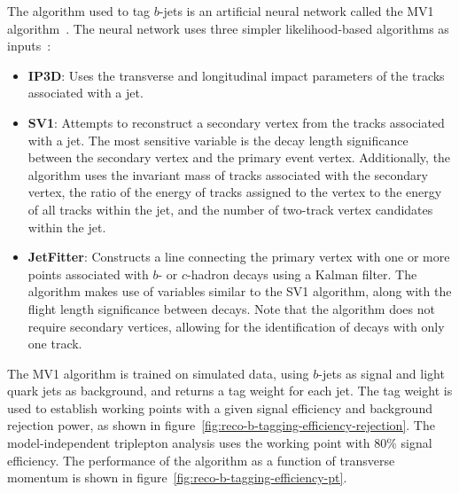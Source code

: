 The algorithm used to tag $b$-jets is an artificial neural network called the MV1 algorithm~\cite{TheATLASCollaboration:2014vj}. The neural network uses three simpler likelihood-based algorithms as inputs~\cite{TheATLASCollaboration:2009ut,TheATLASCollaboration:2011wh}: 

\begin{itemize}
	\item \textbf{IP3D}: Uses the transverse and longitudinal impact parameters of the tracks associated with a jet.
	\item \textbf{SV1}: Attempts to reconstruct a secondary vertex from the tracks associated with a jet. The most sensitive variable is the decay length significance between the secondary vertex and the primary event vertex. Additionally, the algorithm uses the invariant mass of tracks associated with the secondary vertex, the ratio of the energy of tracks assigned to the vertex to the energy of all tracks within the jet, and the number of two-track vertex candidates within the jet. 
	\item \textbf{JetFitter}: Constructs a line connecting the primary vertex with one or more points associated with $b$- or $c$-hadron decays using a Kalman filter. The algorithm makes use of variables similar to the SV1 algorithm, along with the flight length significance between decays. Note that the algorithm does not require secondary vertices, allowing for the identification of decays with only one track. 
\end{itemize}

The MV1 algorithm is trained on simulated data, using $b$-jets as signal and light quark jets as background, and returns a tag weight for each jet. The tag weight is used to establish working points with a given signal efficiency and background rejection power, as shown in figure~\ref{fig:reco-b-tagging-efficiency-rejection}. The model-independent triplepton analysis uses the working point with $80\%$ signal efficiency. The performance of the algorithm as a function of transverse momentum is shown in figure~\ref{fig:reco-b-tagging-efficiency-pt}.

